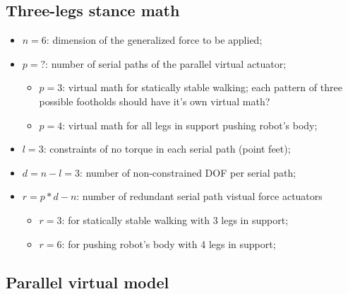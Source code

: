 \documentclass[]{article}
\begin{document}
\subsection{Three-legs stance math}
\begin{itemize}
	\item $n=6$: dimension of the generalized force to be applied;
	\item $p=?$: number of serial paths of the parallel virtual actuator;
	\begin{itemize}
		\item $p=$3: virtual math for statically stable walking; each pattern of three possible footholds should have it's own virtual math?
		\item $p=4$: virtual math for all legs in support pushing robot's body;
	\end{itemize}
	\item $l=3$: constraints of no torque in each serial path (point feet);
	\item $d=n-l=3$: number of non-constrained DOF per serial path;
	\item $r=p*d-n$: number of redundant serial path vistual force actuators
	\begin{itemize}
		\item $r=3$: for statically stable walking with 3 legs in support;
		\item $r=6$: for pushing robot's body with 4 legs in support;
	\end{itemize}
\end{itemize}
\subsection{Parallel virtual model} 




\end{document}
